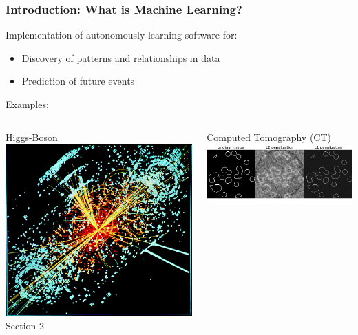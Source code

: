 \documentclass[10pt]{beamer}
\begin{document}
  \begin{frame}[t]\frametitle{Introduction: What is Machine Learning?}
	  	Implementation of autonomously learning software for:
        \begin{itemize}
        	\item Discovery of patterns and relationships in data
        	\item Prediction of future events
        \end{itemize}
        \vspace{5pt}
        \alert{Examples:}
        \begin{columns}
        	\begin{column}{.2\linewidth}
        		Higgs-Boson\\
        		\includegraphics[width = \linewidth]{CMS_Higgs-event.jpg}\\
        		\alert{Section 2}
        	\end{column}\hspace{-10pt}
        	\begin{column}{.2\linewidth}
        		Computed Tomography (CT)\\
        		\includegraphics[width =\linewidth]{plot_tomography_l1_reconstruction_001.png}\\

\end{column}
\end{columns}
\end{frame}
\end{document}
